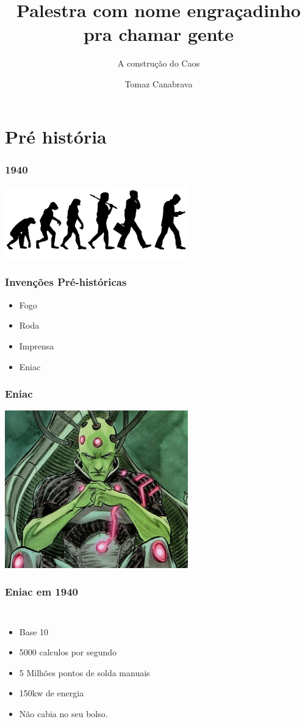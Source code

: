 \documentclass{beamer}
\title{ Palestra com nome engraçadinho pra chamar gente }
\subtitle{ A construção do Caos }
\author{ Tomaz Canabrava }
\begin{document}
\begin{frame} \titlepage \end{frame}

\section{Pré história}

\begin{frame} \frametitle{1940}
    \includegraphics[width=300px]{images/evolution}
\end{frame}

\begin{frame} \frametitle{Invenções Pré-históricas}
    \begin{itemize}
     \item Fogo
     \item Roda
     \item Imprensa
     \pause
     \item Eniac
    \end{itemize}
\end{frame}

\begin{frame} \frametitle{Eniac}
    \includegraphics[width=300px]{images/eniac}
\end{frame}

\begin{frame} \frametitle{Eniac em 1940}
    \begin{columns}
    \begin{itemize}
        \item Base 10
        \pause
        \item 5000 calculos por segundo
        \pause
        \item 5 Milhões pontos de solda manuais
        \pause
        \item 150kw de energia
        \pause
        \item Não cabia no seu bolso.
    \end{itemize}
    \end{columns}
\end{frame}
\end{document}
